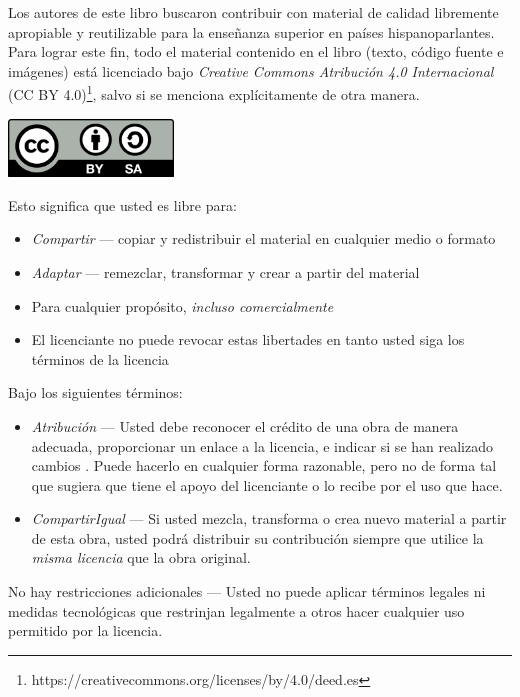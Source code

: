 \documentclass[11pt,fleqn]{book} %
\begin{document}
Los autores de este libro buscaron contribuir con material de calidad
libremente apropiable y reutilizable para la enseñanza superior en
países hispanoparlantes. Para lograr este fin, todo el material
contenido en el libro (texto, código fuente e imágenes) está
licenciado bajo \emph{Creative Commons Atribución 4.0 Internacional} (CC BY
4.0)\footnote{https://creativecommons.org/licenses/by/4.0/deed.es }, salvo
si se menciona explícitamente de otra manera.

\begin{center}
\includegraphics[width=0.33\textwidth]{./img/CC-BY-SA.png}
\end{center}

Esto significa que usted es libre para:

\begin{itemize}
\item \emph{Compartir} — copiar y redistribuir el material en cualquier medio o
  formato
\item \emph{Adaptar} — remezclar, transformar y crear a partir del material
\item Para cualquier propósito, \emph{incluso comercialmente}
\item El licenciante no puede revocar estas libertades en tanto usted siga
  los términos de la licencia
\end{itemize}

Bajo los siguientes términos:

\begin{itemize}
\item \emph{Atribución} — Usted debe reconocer el crédito de una obra de manera
  adecuada, proporcionar un enlace a la licencia, e indicar si se han
  realizado cambios . Puede hacerlo en cualquier forma razonable, pero
  no de forma tal que sugiera que tiene el apoyo del licenciante o lo
  recibe por el uso que hace.
\item \emph{CompartirIgual} — Si usted mezcla, transforma o crea nuevo material
  a partir de esta obra, usted podrá distribuir su contribución
  siempre que utilice la \emph{misma licencia} que la obra original.
\end{itemize}

No hay restricciones adicionales — Usted no puede aplicar términos
legales ni medidas tecnológicas que restrinjan legalmente a otros
hacer cualquier uso permitido por la licencia.
\end{document}
